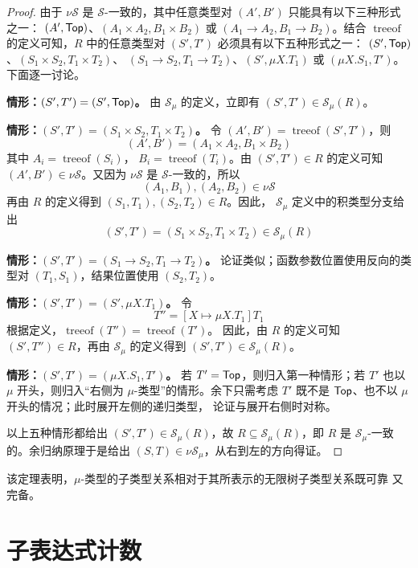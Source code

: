 \begin{proof}
由于 \(\nu\mathcal S\) 是 \(\mathcal S\)-一致的，其中任意类型对
\((A',B')\) 只能具有以下三种形式之一：
\((A',\mathsf{Top})\)、\((A_1\times A_2,B_1\times B_2)\) 或
\((A_1\to A_2,B_1\to B_2)\)。结合
\(\operatorname{treeof}\) 的定义可知，\(R\) 中的任意类型对
\((S',T')\) 必须具有以下五种形式之一：
\((S',\mathsf{Top})\)、\((S_1\times S_2,T_1\times T_2)\)、
\((S_1\to S_2,T_1\to T_2)\)、\((S',\mu X.T_1)\) 或
\((\mu X.S_1,T')\)。下面逐一讨论。

\textbf{情形：\((S',T')=(S',\mathsf{Top})\)。}
由 \(\mathcal S_\mu\) 的定义，立即有
\((S',T')\in\mathcal S_\mu(R)\)。

\textbf{情形：\((S',T')=(S_1\times S_2,T_1\times T_2)\)。}
令 \((A',B')=\operatorname{treeof}(S',T')\)，则
\[
(A',B')=(A_1\times A_2,B_1\times B_2)
\]
其中 \(A_i=\operatorname{treeof}(S_i)\)，
\(B_i=\operatorname{treeof}(T_i)\)。由 \((S',T')\in R\) 的定义可知
\((A',B')\in\nu\mathcal S\)。又因为 \(\nu\mathcal S\) 是
\(\mathcal S\)-一致的，所以
\[
(A_1,B_1),(A_2,B_2)\in\nu\mathcal S
\]
再由 \(R\) 的定义得到 \((S_1,T_1),(S_2,T_2)\in R\)。因此，
\(\mathcal S_\mu\) 定义中的积类型分支给出
\[
(S',T')=(S_1\times S_2,T_1\times T_2)\in\mathcal S_\mu(R)
\]

\textbf{情形：\((S',T')=(S_1\to S_2,T_1\to T_2)\)。}
论证类似；函数参数位置使用反向的类型对 \((T_1,S_1)\)，结果位置使用
\((S_2,T_2)\)。

\textbf{情形：\((S',T')=(S',\mu X.T_1)\)。}
令
\[
T''=[X\mapsto\mu X.T_1]T_1
\]
根据定义，\(\operatorname{treeof}(T'')=\operatorname{treeof}(T')\)。
因此，由 \(R\) 的定义可知 \((S',T'')\in R\)，再由
\(\mathcal S_\mu\) 的定义得到
\((S',T')\in\mathcal S_\mu(R)\)。

\textbf{情形：\((S',T')=(\mu X.S_1,T')\)。}
若 \(T'=\mathsf{Top}\)，则归入第一种情形；若 \(T'\) 也以 \(\mu\)
开头，则归入“右侧为 \(\mu\)-类型”的情形。余下只需考虑 \(T'\) 既不是
\(\mathsf{Top}\)、也不以 \(\mu\) 开头的情况；此时展开左侧的递归类型，
论证与展开右侧时对称。

以上五种情形都给出 \((S',T')\in\mathcal S_\mu(R)\)，故
\(R\subseteq\mathcal S_\mu(R)\)，即 \(R\) 是
\(\mathcal S_\mu\)-一致的。余归纳原理于是给出
\((S,T)\in\nu\mathcal S_\mu\)，从右到左的方向得证。
\end{proof}

该定理表明，\(\mu\)-类型的子类型关系相对于其所表示的无限树子类型关系既可靠
又完备。

\section{子表达式计数}
\label{sec:21.9}

